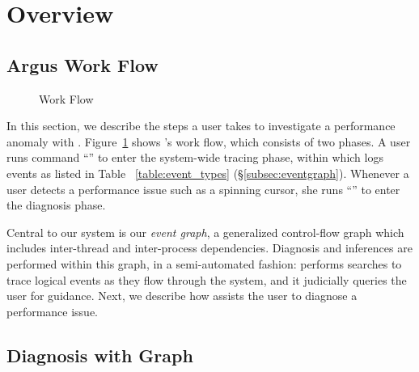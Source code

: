 \section{Overview}\label{sec:overview}

\subsection{Argus Work Flow}
\begin{figure}[tb]
    \centering
    
    \caption{\xxx Work Flow}
    \label{fig:argus-overview}
\end{figure}

In this section, we describe the steps a user takes to investigate a performance
anomaly with \xxx. Figure~\ref{fig:argus-overview} shows \xxx's work flow, which
consists of two phases. A user runs command ``'' to enter the
system-wide tracing phase, within which \xxx logs events as listed in Table
~\ref{table:event_types} (\S\ref{subsec:eventgraph}). Whenever a user detects
a performance issue such as a spinning cursor, she runs ``'' to
enter the diagnosis phase.


Central to our system is our \emph{event graph}, a generalized control-flow
graph which includes inter-thread and inter-process dependencies. Diagnosis
and inferences are performed within this graph, in a semi-automated fashion:
\xxx performs searches to trace logical events as they
flow through the system, and it judicially queries the user for guidance.
Next, we describe how \xxx assists the user to diagnose a performance issue.

\subsection{Diagnosis with Graph}\label{subsec:debug}

